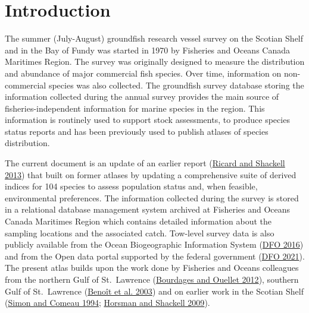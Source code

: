 \documentclass[12pt]{article}\usepackage[]{graphicx}\usepackage[]{color}
\begin{document}

\frontmatter


\renewcommand{\headrulewidth}{0.5pt}  %
\renewcommand{\footrulewidth}{0.5pt}  %

\newcommand{\lt}{\ensuremath <}
\newcommand{\gt}{\ensuremath >}

\newlength{\cslhangindent}
\setlength{\cslhangindent}{1.5em}
\newenvironment{cslreferences}%
  {}%
  {\par}

\hypertarget{sec:introduction}{%
\section{Introduction}\label{sec:introduction}}

The summer (July-August) groundfish research vessel survey on the Scotian Shelf and in the Bay of Fundy was started in 1970 by Fisheries and Oceans Canada Maritimes Region. The survey was originally designed to measure the distribution and abundance of major commercial fish species. Over time, information on non-commercial species was also collected. The groundfish survey database storing the information collected during the annual survey provides the main source of fisheries-independent information for marine species in the region. This information is routinely used to support stock assessments, to produce species status reports and has been previously used to publish atlases of species distribution.

The current document is an update of an earlier report (\protect\hyperlink{ref-Ricard:MARatlas:2013}{Ricard and Shackell 2013}) that built on former atlases by updating a comprehensive suite of derived indices for 104 species to assess population status and, when feasible, environmental preferences. The information collected during the survey is stored in a relational database management system archived at Fisheries and Oceans Canada Maritimes Region which contains detailed information about the sampling locations and the associated catch. Tow-level survey data is also publicly available from the Ocean Biogeographic Information System (\protect\hyperlink{ref-DFO:2016}{DFO 2016}) and from the Open data portal supported by the federal government (\protect\hyperlink{ref-OpenData_MAR_RV}{DFO 2021}). The present atlas builds upon the work done by Fisheries and Oceans colleagues from the northern Gulf of St.~Lawrence (\protect\hyperlink{ref-Bourdages:NGatlas:2012}{Bourdages and Ouellet 2012}), southern Gulf of St.~Lawrence (\protect\hyperlink{ref-Benoit:etal:2003:techreport}{Benoît et al. 2003}) and on earlier work in the Scotian Shelf (\protect\hyperlink{ref-Simon:Comeau:1994}{Simon and Comeau 1994}; \protect\hyperlink{ref-Horsman:atlas:2009}{Horsman and Shackell 2009}).
\end{document}
